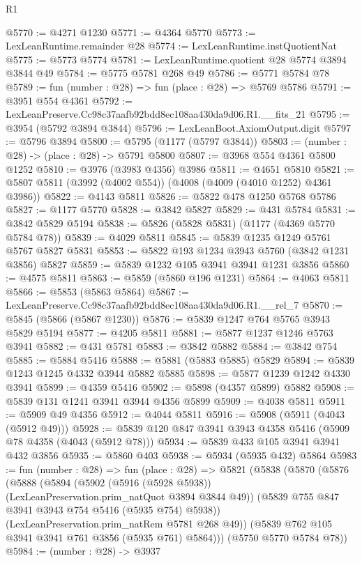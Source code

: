 \begin{lexlean}{R1}
\begin{coremodule}
@5770 := @4271 @1230
@5771 := @4364 @5770
@5773 := LexLeanRuntime.remainder @28
@5774 := LexLeanRuntime.instQuotientNat
@5775 := @5773 @5774
@5781 := LexLeanRuntime.quotient @28 @5774 @3894 @3844 @49
@5784 := @5775 @5781 @268 @49
@5786 := @5771 @5784 @78
@5789 := fun (number : @28) => fun (place : @28) => @5769 @5786
@5791 := @3951 @554 @4361
@5792 := LexLeanPreserve.Cc98c37aafb92bdd8ec108aa430da9d06.R1.__fits_21
@5795 := @3954 (@5792 @3894 @3844)
@5796 := LexLeanBoot.AxiomOutput.digit
@5797 := @5796 @3894
@5800 := @5795 (@1177 (@5797 @3844))
@5803 := (number : @28) -> (place : @28) -> @5791 @5800
@5807 := @3968 @554 @4361 @5800 @1252
@5810 := @3976 (@3983 @4356) @3986
@5811 := @4651 @5810
@5821 := @5807 @5811 (@3992 (@4002 @554)) (@4008 (@4009 (@4010 @1252) @4361 @3986))
@5822 := @4143 @5811
@5826 := @5822 @478 @1250 @5768 @5786
@5827 := @1177 @5770
@5828 := @3842 @5827
@5829 := @431 @5784
@5831 := @3842 @5829 @5194
@5838 := @5826 (@5828 @5831) (@1177 (@4369 @5770 @5784 @78))
@5839 := @4029 @5811
@5845 := @5839 @1235 @1249 @5761 @5767 @5827 @5831
@5853 := @5822 @193 @1234 @3943 @5760 (@3842 @1231 @3856) @5827
@5859 := @5839 @1232 @105 @3941 @3941 @1231 @3856
@5860 := @4575 @5811
@5863 := @5859 (@5860 @196 @1231)
@5864 := @4063 @5811
@5866 := @5853 (@5863 @5864)
@5867 := LexLeanPreserve.Cc98c37aafb92bdd8ec108aa430da9d06.R1.__rel_7
@5870 := @5845 (@5866 (@5867 @1230))
@5876 := @5839 @1247 @764 @5765 @3943 @5829 @5194
@5877 := @4205 @5811
@5881 := @5877 @1237 @1246 @5763 @3941
@5882 := @431 @5781
@5883 := @3842 @5882
@5884 := @3842 @754
@5885 := @5884 @5416
@5888 := @5881 (@5883 @5885) @5829
@5894 := @5839 @1243 @1245 @4332 @3944 @5882 @5885
@5898 := @5877 @1239 @1242 @4330 @3941
@5899 := @4359 @5416
@5902 := @5898 (@4357 @5899) @5882
@5908 := @5839 @131 @1241 @3941 @3944 @4356 @5899
@5909 := @4038 @5811
@5911 := @5909 @49 @4356
@5912 := @4044 @5811
@5916 := @5908 (@5911 (@4043 (@5912 @49)))
@5928 := @5839 @120 @847 @3941 @3943 @4358 @5416 (@5909 @78 @4358 (@4043 (@5912 @78)))
@5934 := @5839 @433 @105 @3941 @3941 @432 @3856
@5935 := @5860 @403
@5938 := @5934 (@5935 @432) @5864
@5983 := fun (number : @28) =>
  fun (place : @28) =>
  @5821
    (@5838
      (@5870
        (@5876
          (@5888
            (@5894
              (@5902 (@5916 (@5928 @5938)) (LexLeanPreservation.prim_natQuot @3894 @3844 @49))
              (@5839 @755 @847 @3941 @3943 @754 @5416 (@5935 @754) @5938))
            (LexLeanPreservation.prim_natRem @5781 @268 @49))
          (@5839 @762 @105 @3941 @3941 @761 @3856 (@5935 @761) @5864)))
      (@5750 @5770 @5784 @78))
@5984 := (number : @28) -> @3937

\end{coremodule}
\end{lexlean}
